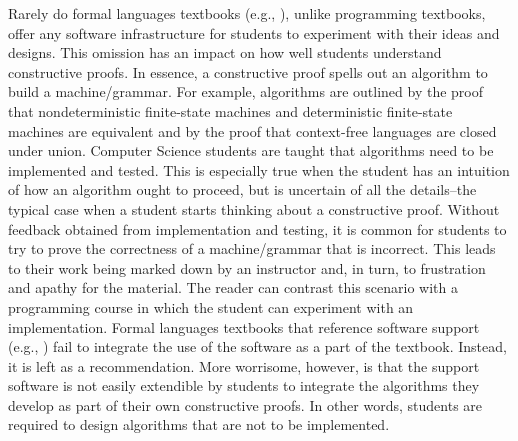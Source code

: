 \documentclass{eptcs}
\begin{document}
Rarely do formal languages textbooks (e.g., \cite{Lewis,Martin,Sipser}), unlike programming textbooks, offer any software infrastructure for students to experiment with their ideas and designs. This omission has an impact on how well students understand constructive proofs. In essence, a constructive proof spells out an algorithm to build a machine/grammar. For example, algorithms are outlined by the proof that nondeterministic finite-state machines and deterministic finite-state machines are equivalent and by the proof that context-free languages are closed under union. Computer Science students are taught that algorithms need to be implemented and tested. This is especially true when the student has an intuition of how an algorithm ought to proceed, but is uncertain of all the details--the typical case when a student starts thinking about a constructive proof. Without feedback obtained from implementation and testing, it is common for students to try to prove the correctness of a machine/grammar that is incorrect. This leads to their work being marked down by an instructor and, in turn, to frustration and apathy for the material. The reader can contrast this scenario with a programming course in which the student can experiment with an implementation. Formal languages textbooks that reference software support (e.g., \cite{Linz}) fail to integrate the use of the software as a part of the textbook. Instead, it is left as a recommendation. More worrisome, however, is that the support software is not easily extendible by students to integrate the algorithms they develop as part of their own constructive proofs. In other words, students are required to design algorithms that are not to be implemented.
\end{document}
